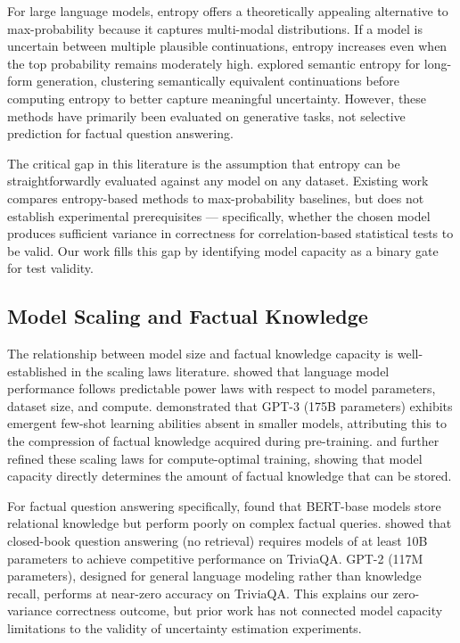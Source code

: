 For large language models, entropy offers a theoretically appealing alternative to max-probability because it captures multi-modal distributions. If a model is uncertain between multiple plausible continuations, entropy increases even when the top probability remains moderately high. \citet{Kuhn2023} explored semantic entropy for long-form generation, clustering semantically equivalent continuations before computing entropy to better capture meaningful uncertainty. However, these methods have primarily been evaluated on generative tasks, not selective prediction for factual question answering.

The critical gap in this literature is the assumption that entropy can be straightforwardly evaluated against any model on any dataset. Existing work compares entropy-based methods to max-probability baselines, but does not establish experimental prerequisites --- specifically, whether the chosen model produces sufficient variance in correctness for correlation-based statistical tests to be valid. Our work fills this gap by identifying model capacity as a binary gate for test validity.

\subsection{Model Scaling and Factual Knowledge}

The relationship between model size and factual knowledge capacity is well-established in the scaling laws literature. \citet{Kaplan2020} showed that language model performance follows predictable power laws with respect to model parameters, dataset size, and compute. \citet{Brown2020} demonstrated that GPT-3 (175B parameters) exhibits emergent few-shot learning abilities absent in smaller models, attributing this to the compression of factual knowledge acquired during pre-training. \citet{Rae2021} and \citet{Hoffmann2022} further refined these scaling laws for compute-optimal training, showing that model capacity directly determines the amount of factual knowledge that can be stored.

For factual question answering specifically, \citet{Petroni2019} found that BERT-base models store relational knowledge but perform poorly on complex factual queries. \citet{Roberts2020} showed that closed-book question answering (no retrieval) requires models of at least 10B parameters to achieve competitive performance on TriviaQA. GPT-2 (117M parameters), designed for general language modeling rather than knowledge recall, performs at near-zero accuracy on TriviaQA. This explains our zero-variance correctness outcome, but prior work has not connected model capacity limitations to the validity of uncertainty estimation experiments.

